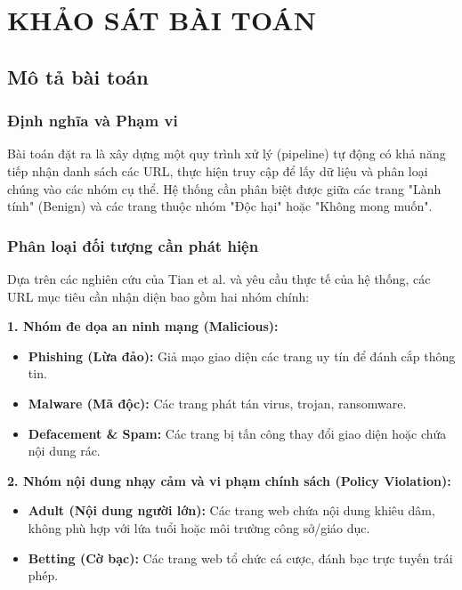 \documentclass[a4paper,12pt]{report}
\begin{document}
\chapter{KHẢO SÁT BÀI TOÁN}

\section{Mô tả bài toán}
\subsection{Định nghĩa và Phạm vi}
Bài toán đặt ra là xây dựng một quy trình xử lý (pipeline) tự động có khả năng tiếp nhận danh sách các URL, thực hiện truy cập để lấy dữ liệu và phân loại chúng vào các nhóm cụ thể. Hệ thống cần phân biệt được giữa các trang "Lành tính" (Benign) và các trang thuộc nhóm "Độc hại" hoặc "Không mong muốn".

\subsection{Phân loại đối tượng cần phát hiện}
Dựa trên các nghiên cứu của Tian et al. và yêu cầu thực tế của hệ thống, các URL mục tiêu cần nhận diện bao gồm hai nhóm chính:

\textbf{1. Nhóm đe dọa an ninh mạng (Malicious):}
\begin{itemize}
    \item \textbf{Phishing (Lừa đảo):} Giả mạo giao diện các trang uy tín để đánh cắp thông tin.
    \item \textbf{Malware (Mã độc):} Các trang phát tán virus, trojan, ransomware.
    \item \textbf{Defacement \& Spam:} Các trang bị tấn công thay đổi giao diện hoặc chứa nội dung rác.
\end{itemize}

\textbf{2. Nhóm nội dung nhạy cảm và vi phạm chính sách (Policy Violation):}
\begin{itemize}
    \item \textbf{Adult (Nội dung người lớn):} Các trang web chứa nội dung khiêu dâm, không phù hợp với lứa tuổi hoặc môi trường công sở/giáo dục.
    \item \textbf{Betting (Cờ bạc):} Các trang web tổ chức cá cược, đánh bạc trực tuyến trái phép.
\end{itemize}
\end{document}
